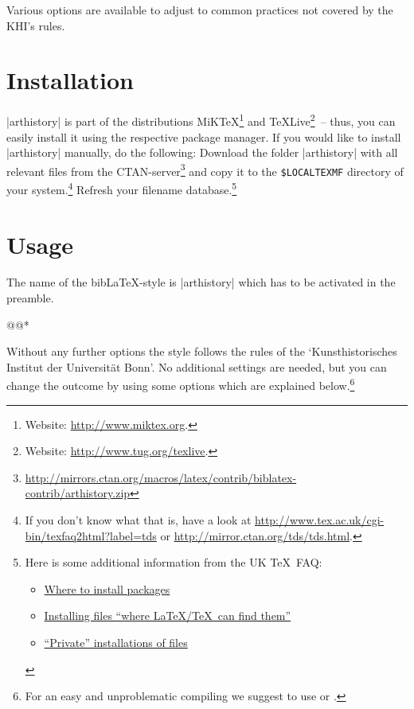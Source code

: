 \documentclass[a4paper,
10pt,
ngerman,
english
]{ltxdoc}
\begin{document}
Various options are available to adjust to common practices not covered by the KHI's rules.

\section{Installation}
|arthistory| is part of the distributions MiK\TeX \footnote{Website: \url{http://www.miktex.org}.} 
and \TeX Live\footnote{Website: \url{http://www.tug.org/texlive}.}~-- thus, you
can easily install it using the respective package manager. 
If you would like to
install |arthistory| manually, do the following:
Download the folder |arthistory| with all relevant files from the CTAN-server\footnote{\url{http://mirrors.ctan.org/macros/latex/contrib/biblatex-contrib/arthistory.zip}} and copy it to the \texttt{\$LOCALTEXMF} directory of
 your system.\footnote{If you don't know what that is, have a look at
\url{http://www.tex.ac.uk/cgi-bin/texfaq2html?label=tds} or 
\url{http://mirror.ctan.org/tds/tds.html}.} 
Refresh your filename database.\footnote{ 
Here is some additional information from the UK \TeX\ FAQ:
\begin{itemize}[nosep,after=\vspace{-\baselineskip} ]
  \item \href{%
    http://www.tex.ac.uk/cgi-bin/texfaq2html?label=install-where}{%
    Where to install packages}
  \item \href{%
    http://www.tex.ac.uk/cgi-bin/texfaq2html?label=inst-wlcf}{%
    Installing files \enquote{where \LaTeX /TeX\ can find them}}
  \item \href{%
    http://www.tex.ac.uk/cgi-bin/texfaq2html?label=privinst}{%
    \enquote{Private} installations of files}
\end{itemize}
}

\section{Usage}
  The name of the bib\LaTeX-style is |arthistory| which has to be activated in the preamble. 

\begin{code}
\usepackage[style=arthistory,%
          *@@*]{biblatex}
@@*
\end{code}

Without any further options the style follows the rules of the \enquote*{Kunsthistorisches Institut der Universität Bonn}.
No additional settings are needed,
but you can change the outcome by using some options which are explained below.\footnote{For an easy and unproblematic compiling we suggest to use  or .}
\end{document}
